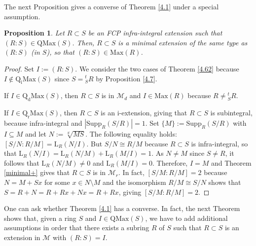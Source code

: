 \documentclass[12pt,leqno]{amsart}
\newtheorem{proposition}[theorem]{Proposition}
\theoremstyle{definition}
\begin{document}
The next Proposition gives a converse of Theorem \ref{4.1} under a special assumption.

\begin{proposition}\label{4.6} Let $R\subset S$ be an FCP infra-integral extension such that $(R:S)\in\mathrm{QMax}(S)$. Then, $R\subset S$ is a minimal extension of the same type as $(R:S)$ (in $S$), so that $(R:S)\in\mathrm{Max}(R)$.
\end{proposition}
\begin{proof} Set $I:=(R:S)$. We consider the two cases of Theorem \ref{4.62} because $I\not\in\mathrm{Q_iMax}(S)$ since $S={}_S^tR$ by Proposition \ref{4.7}. 

If $I\in\mathrm{Q_dMax}(S)$, then $R\subset S$ is in $\mathcal M_d$ and $I\in\mathrm {Max}(R)$ because $R\neq{}_S^tR$. 

If $I\in\mathrm{Q_rMax}(S)$, then $R\subset S$ is an i-extension, giving that $R\subset S$ is subintegral, because infra-integral and $|\mathrm {Supp}_R(S/R)|=1$. Set $\{M\}:=\mathrm{Supp}_R(S/R)$ with $I\subseteq M$ and let $N:=\sqrt[S]{MS}$. The following equality holds: $[S/N:R/M]=\mathrm{L}_{R}(N/I)$. But $S/N\cong R/M$ because $R\subset S$ is infra-integral, so that $\mathrm{L}_{R}(N/I)=\mathrm{L}_{R}(N/M)+\mathrm{L}_ {R}(M/I)=1$. As $N\neq M$ since $S\neq R$, it follows that $\mathrm{L}_ {R}(N/M)\neq 0$ and $\mathrm{L}_{R}(M/I)=0$. Therefore, $I=M$ and Theorem \ref{minimal+} gives that $R\subset S$ is in $\mathcal M_r$. In fact, $[S/M: R/M]=2$ because $N=M+Sx$ for some $x\in N\setminus M$ and the isomorphism $R/M\cong S/N$ shows that $S=R+N=R+Rx+Nx=R+Rx$, giving $[S/M:R/M]=2$.
\end{proof}

One can ask whether Theorem \ref{4.1} has a converse. In fact, the next 
 Theorem shows that, given a ring $S$ and $I\in\mathrm{QMax}(S)$, we have to add additional assumptions in order that there exists a subring $R$ of $S$ such that $R\subset S$ is an extension in $\mathcal M$ with $(R:S)=I$. 
\end{document}
